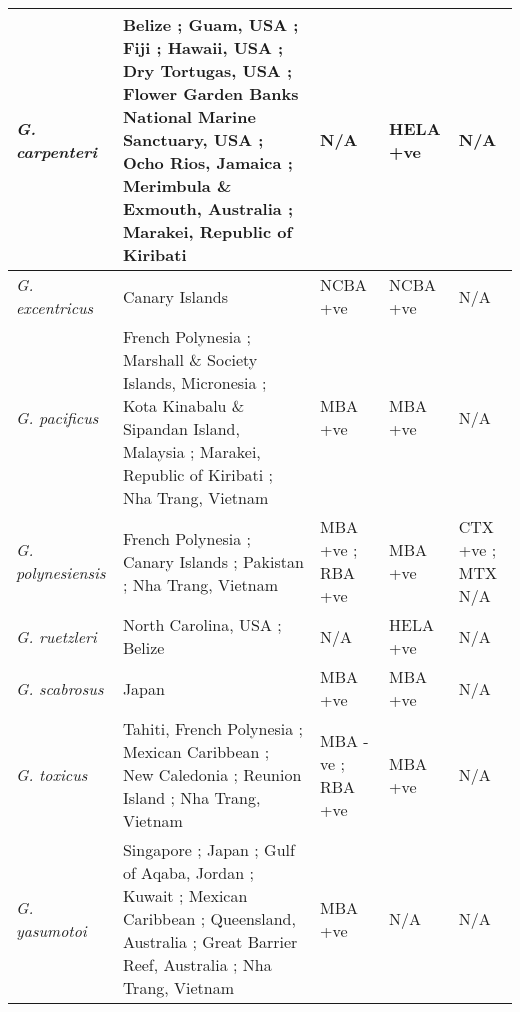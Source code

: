 \documentclass[12pt]{article}
\begin{document}
\begin{longtable}{ | p{2cm} | p{5.5cm} | p{2.3cm} | p{2.3cm} | p{2.3cm} | }
	\hline
	\emph{G. carpenteri} & Belize \cite{litaker2009taxonomy}; Guam, USA \cite{litaker2009taxonomy}; Fiji \cite{litaker2009taxonomy}; Hawaii, USA \cite{}; Dry Tortugas, USA \cite{holland2013differences}; Flower Garden Banks National Marine Sanctuary, USA \cite{holland2013differences}; Ocho Rios, Jamaica \cite{}; Merimbula \& Exmouth, Australia \cite{kohli2014cob}; Marakei, Republic of Kiribati \cite{xu2014distribution} & N/A & HELA +ve \cite{holland2013differences} & N/A \\
	\hline
	\emph{G. excentricus} & Canary Islands \cite{fraga2011gambierdiscus} & NCBA +ve \cite{fraga2011gambierdiscus} & NCBA +ve \cite{fraga2011gambierdiscus} & N/A \\
	\hline
		\emph{G. pacificus} & French Polynesia \cite{chinain1999morphology}; Marshall \& Society Islands, Micronesia \cite{litaker2010global}; Kota Kinabalu \& Sipandan Island, Malaysia \cite{mohammad2005marine}; Marakei, Republic of Kiribati \cite{xu2014distribution}; Nha Trang, Vietnam \cite{} & MBA +ve \cite{chinain1999morphology} & MBA +ve \cite{chinain1999morphology} & N/A \\
	\hline
	\emph{G. polynesiensis} & French Polynesia \cite{chinain1999morphology}; Canary Islands \cite{fraga2011gambierdiscus}; Pakistan \cite{munir2011occurrence}; Nha Trang, Vietnam \cite{} & MBA +ve \cite{chinain1999morphology}; RBA +ve \cite{chinain2010growth} & MBA +ve \cite{chinain1999morphology} & CTX +ve \cite{chinain2010growth}; MTX N/A \\
	\hline
	\emph{G. ruetzleri} & North Carolina, USA \cite{litaker2009taxonomy}; Belize \cite{litaker2009taxonomy} & N/A & HELA +ve \cite{holland2013differences} & N/A \\
	\hline
	\emph{G. scabrosus} & Japan \cite{nishimura2013genetic} & MBA +ve \cite{nishimura2013genetic} & MBA +ve \cite{nishimura2013genetic} & N/A \\
	\hline
	\emph{G. toxicus} & Tahiti, French Polynesia \cite{adachi1979thecal,chinain1999morphology}; Mexican Caribbean \cite{hernandez2004species}; New Caledonia \cite{chinain1999morphology}; Reunion Island \cite{chinain1999morphology}; Nha Trang, Vietnam \cite{roeder2010characteristic} & MBA -ve \cite{chinain1999morphology}; RBA +ve \cite{chinain2010growth} & MBA +ve \cite{chinain1999morphology} & N/A \\
	\hline
	\emph{G. yasumotoi} & Singapore \cite{holmes1998gambierdiscus}; Japan \cite{nishimura2013genetic}; Gulf of Aqaba, Jordan \cite{saburova2013new}; Kuwait \cite{saburova2013new}; Mexican Caribbean \cite{hernandez2004species}; Queensland, Australia \cite{}; Great Barrier Reef, Australia \cite{murray2014molecular}; Nha Trang, Vietnam \cite{} & MBA +ve \cite{} & N/A & N/A \\ %

\end{longtable}
\end{document}
